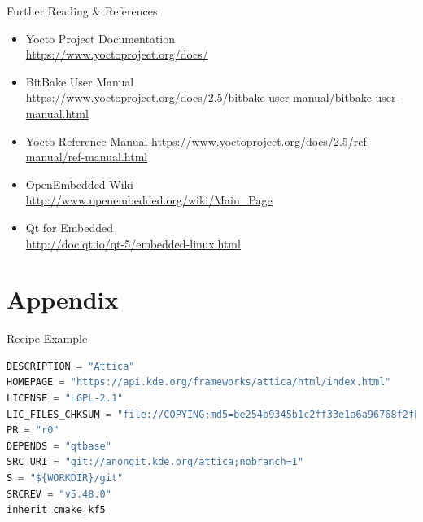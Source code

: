 \documentclass[ucs,9pt]{beamer}
\begin{document}
\begin{frame}
    {Further Reading \& References}
    \begin{itemize}
        \item Yocto Project Documentation\\
            \url{https://www.yoctoproject.org/docs/}
        \item BitBake User Manual\\
            \url{https://www.yoctoproject.org/docs/2.5/bitbake-user-manual/bitbake-user-manual.html}
        \item Yocto Reference Manual
            \url{https://www.yoctoproject.org/docs/2.5/ref-manual/ref-manual.html}
        \item OpenEmbedded Wiki\\
            \url{http://www.openembedded.org/wiki/Main_Page}
        \item Qt for Embedded\\
            \url{http://doc.qt.io/qt-5/embedded-linux.html}
    \end{itemize}
\end{frame}

\KDElastframe

\section{Appendix}
\begin{frame}[fragile]
    {Recipe Example}

    \begin{example}{}
    \hspace{1em}\begin{minipage}{.95\linewidth}
    \begin{lstlisting}[caption=attica\_5.48.0.bb,language=Python]
DESCRIPTION = "Attica"
HOMEPAGE = "https://api.kde.org/frameworks/attica/html/index.html"
LICENSE = "LGPL-2.1"
LIC_FILES_CHKSUM = "file://COPYING;md5=be254b9345b1c2ff33e1a6a96768f2fb"
PR = "r0"
DEPENDS = "qtbase"
SRC_URI = "git://anongit.kde.org/attica;nobranch=1"
S = "${WORKDIR}/git"
SRCREV = "v5.48.0"
inherit cmake_kf5
    \end{lstlisting}
    \end{minipage}
    \end{example}
\end{frame}
\end{document}
